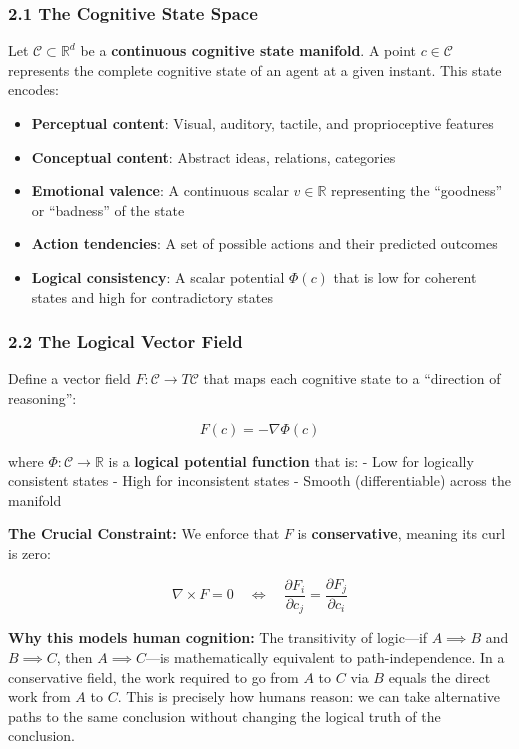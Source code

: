 \documentclass[
  11pt,
  a4paper,
]{article}
\providecommand{\tightlist}{%
  \setlength{\itemsep}{0pt}\setlength{\parskip}{0pt}}
\begin{document}
\subsubsection{2.1 The Cognitive State
Space}\label{the-cognitive-state-space}

Let \(\mathcal{C} \subset \mathbb{R}^d\) be a \textbf{continuous
cognitive state manifold}. A point \(c \in \mathcal{C}\) represents the
complete cognitive state of an agent at a given instant. This state
encodes:

\begin{itemize}
\tightlist
\item
  \textbf{Perceptual content}: Visual, auditory, tactile, and
  proprioceptive features
\item
  \textbf{Conceptual content}: Abstract ideas, relations, categories
\item
  \textbf{Emotional valence}: A continuous scalar \(v \in \mathbb{R}\)
  representing the ``goodness'' or ``badness'' of the state
\item
  \textbf{Action tendencies}: A set of possible actions and their
  predicted outcomes
\item
  \textbf{Logical consistency}: A scalar potential \(\Phi(c)\) that is
  low for coherent states and high for contradictory states
\end{itemize}

\subsubsection{2.2 The Logical Vector
Field}\label{the-logical-vector-field}

Define a vector field \(F: \mathcal{C} \to T\mathcal{C}\) that maps each
cognitive state to a ``direction of reasoning'':

\[F(c) = -\nabla \Phi(c)\]

where \(\Phi: \mathcal{C} \to \mathbb{R}\) is a \textbf{logical
potential function} that is: - Low for logically consistent states -
High for inconsistent states - Smooth (differentiable) across the
manifold

\textbf{The Crucial Constraint:} We enforce that \(F\) is
\textbf{conservative}, meaning its curl is zero:

\[\nabla \times F = 0 \quad \Longleftrightarrow \quad \frac{\partial F_i}{\partial c_j} = \frac{\partial F_j}{\partial c_i}\]

\textbf{Why this models human cognition:} The transitivity of logic---if
\(A \implies B\) and \(B \implies C\), then \(A \implies C\)---is
mathematically equivalent to path-independence. In a conservative field,
the work required to go from \(A\) to \(C\) via \(B\) equals the direct
work from \(A\) to \(C\). This is precisely how humans reason: we can
take alternative paths to the same conclusion without changing the
logical truth of the conclusion.
\end{document}
